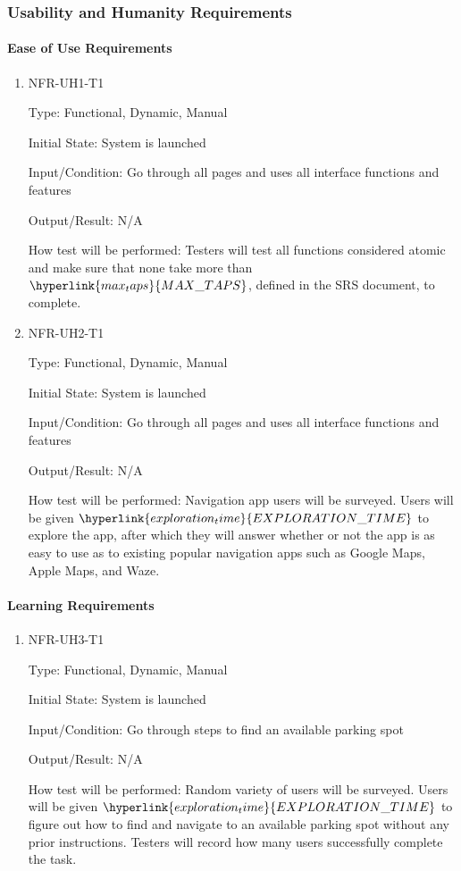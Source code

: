 \documentclass[12pt, titlepage]{article}
\begin{document}
\subsubsection{Usability and Humanity Requirements}
\label{sec:5.2.2}
\paragraph{Ease of Use Requirements}

\begin{enumerate}

\item{NFR-UH1-T1}

Type: Functional, Dynamic, Manual
					
Initial State: System is launched
					
Input/Condition: Go through all pages and uses all interface functions and
features
					
Output/Result: N/A
					
How test will be performed: Testers will test all functions considered atomic
and make sure that none take more than $\hyperlink{max_taps}{MAX\_TAPS}$,
defined in the SRS document, to complete.
				
\item{NFR-UH2-T1}

Type: Functional, Dynamic, Manual
					
Initial State: System is launched
					
Input/Condition: Go through all pages and uses all interface functions and
features
					
Output/Result: N/A
					
How test will be performed: Navigation app users will be surveyed. Users will be
given $\hyperlink{exploration_time}{EXPLORATION\_TIME}$ to explore the app,
after which they will answer whether or not the app is as easy to use as to
existing popular navigation apps such as Google Maps, Apple Maps, and Waze.
					
\end{enumerate}

\paragraph{Learning Requirements}

\begin{enumerate}

\item{NFR-UH3-T1}

Type: Functional, Dynamic, Manual
					
Initial State: System is launched
					
Input/Condition: Go through steps to find an available parking spot
					
Output/Result: N/A
					
How test will be performed: Random variety of users will be surveyed. Users will
be given $\hyperlink{exploration_time}{EXPLORATION\_TIME}$ to figure out how to
find and navigate to an available parking spot without any prior instructions.
Testers will record how many users successfully complete the task.
					
\end{enumerate}
\end{document}
